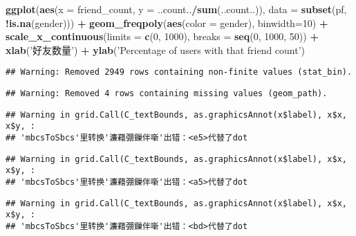 \documentclass[]{article}
\newenvironment{Shaded}{\begin{snugshade}}{\end{snugshade}}
\newcommand{\DataTypeTok}[1]{\textcolor[rgb]{0.13,0.29,0.53}{#1}}
\newcommand{\DecValTok}[1]{\textcolor[rgb]{0.00,0.00,0.81}{#1}}
\newcommand{\KeywordTok}[1]{\textcolor[rgb]{0.13,0.29,0.53}{\textbf{#1}}}
\newcommand{\NormalTok}[1]{#1}
\newcommand{\OperatorTok}[1]{\textcolor[rgb]{0.81,0.36,0.00}{\textbf{#1}}}
\newcommand{\StringTok}[1]{\textcolor[rgb]{0.31,0.60,0.02}{#1}}
\begin{document}
\begin{Shaded}
\begin{Highlighting}[]
\KeywordTok{ggplot}\NormalTok{(}\KeywordTok{aes}\NormalTok{(}\DataTypeTok{x =}\NormalTok{ friend_count, }\DataTypeTok{y =}\NormalTok{ ..count..}\OperatorTok{/}\KeywordTok{sum}\NormalTok{(..count..)), }\DataTypeTok{data =} \KeywordTok{subset}\NormalTok{(pf, }\OperatorTok{!}\KeywordTok{is.na}\NormalTok{(gender))) }\OperatorTok{+}
\StringTok{  }\KeywordTok{geom_freqpoly}\NormalTok{(}\KeywordTok{aes}\NormalTok{(}\DataTypeTok{color =}\NormalTok{ gender), }\DataTypeTok{binwidth=}\DecValTok{10}\NormalTok{) }\OperatorTok{+}\StringTok{ }
\StringTok{  }\KeywordTok{scale_x_continuous}\NormalTok{(}\DataTypeTok{limits =} \KeywordTok{c}\NormalTok{(}\DecValTok{0}\NormalTok{, }\DecValTok{1000}\NormalTok{), }\DataTypeTok{breaks =} \KeywordTok{seq}\NormalTok{(}\DecValTok{0}\NormalTok{, }\DecValTok{1000}\NormalTok{, }\DecValTok{50}\NormalTok{)) }\OperatorTok{+}\StringTok{ }
\StringTok{  }\KeywordTok{xlab}\NormalTok{(}\StringTok{'好友数量'}\NormalTok{) }\OperatorTok{+}\StringTok{ }
\StringTok{  }\KeywordTok{ylab}\NormalTok{(}\StringTok{'Percentage of users with that friend count'}\NormalTok{)}
\end{Highlighting}
\end{Shaded}

\begin{verbatim}
## Warning: Removed 2949 rows containing non-finite values (stat_bin).
\end{verbatim}

\begin{verbatim}
## Warning: Removed 4 rows containing missing values (geom_path).
\end{verbatim}

\begin{verbatim}
## Warning in grid.Call(C_textBounds, as.graphicsAnnot(x$label), x$x, x$y, :
## 'mbcsToSbcs'里转换'濂藉弸鏁伴噺'出错：<e5>代替了dot
\end{verbatim}

\begin{verbatim}
## Warning in grid.Call(C_textBounds, as.graphicsAnnot(x$label), x$x, x$y, :
## 'mbcsToSbcs'里转换'濂藉弸鏁伴噺'出错：<a5>代替了dot
\end{verbatim}

\begin{verbatim}
## Warning in grid.Call(C_textBounds, as.graphicsAnnot(x$label), x$x, x$y, :
## 'mbcsToSbcs'里转换'濂藉弸鏁伴噺'出错：<bd>代替了dot
\end{verbatim}
\end{document}
